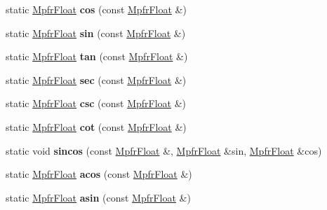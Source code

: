 \begin{DoxyCompactItemize}
\mbox{\label{class_mpfr_float_a31472a37b4a9f887cf41785da12f87a7}} 
static \hyperlink{class_mpfr_float}{Mpfr\+Float} {\bfseries cos} (const \hyperlink{class_mpfr_float}{Mpfr\+Float} \&)
\item 
\mbox{\label{class_mpfr_float_a7c980d59b703fb365805933289ab1aed}} 
static \hyperlink{class_mpfr_float}{Mpfr\+Float} {\bfseries sin} (const \hyperlink{class_mpfr_float}{Mpfr\+Float} \&)
\item 
\mbox{\label{class_mpfr_float_a3ebed09f4b532a8c7576bba78287637f}} 
static \hyperlink{class_mpfr_float}{Mpfr\+Float} {\bfseries tan} (const \hyperlink{class_mpfr_float}{Mpfr\+Float} \&)
\item 
\mbox{\label{class_mpfr_float_affa0c0b9e81a97a7943050c573fdd550}} 
static \hyperlink{class_mpfr_float}{Mpfr\+Float} {\bfseries sec} (const \hyperlink{class_mpfr_float}{Mpfr\+Float} \&)
\item 
\mbox{\label{class_mpfr_float_a78df3b7e61935b8af093cdb615d55b89}} 
static \hyperlink{class_mpfr_float}{Mpfr\+Float} {\bfseries csc} (const \hyperlink{class_mpfr_float}{Mpfr\+Float} \&)
\item 
\mbox{\label{class_mpfr_float_a93a126d75c9680f83b3fb1bf129296e9}} 
static \hyperlink{class_mpfr_float}{Mpfr\+Float} {\bfseries cot} (const \hyperlink{class_mpfr_float}{Mpfr\+Float} \&)
\item 
\mbox{\label{class_mpfr_float_a909ee063cfdbe76bbd4069065f79ae59}} 
static void {\bfseries sincos} (const \hyperlink{class_mpfr_float}{Mpfr\+Float} \&, \hyperlink{class_mpfr_float}{Mpfr\+Float} \&sin, \hyperlink{class_mpfr_float}{Mpfr\+Float} \&cos)
\item 
\mbox{\label{class_mpfr_float_aab65d26e7eed2e2d767c44d00af30f4d}} 
static \hyperlink{class_mpfr_float}{Mpfr\+Float} {\bfseries acos} (const \hyperlink{class_mpfr_float}{Mpfr\+Float} \&)
\item 
\mbox{\label{class_mpfr_float_a1466a8f80f7e1bb6c321f4b8f8c9b47b}} 
static \hyperlink{class_mpfr_float}{Mpfr\+Float} {\bfseries asin} (const \hyperlink{class_mpfr_float}{Mpfr\+Float} \&)

\end{DoxyCompactItemize}
